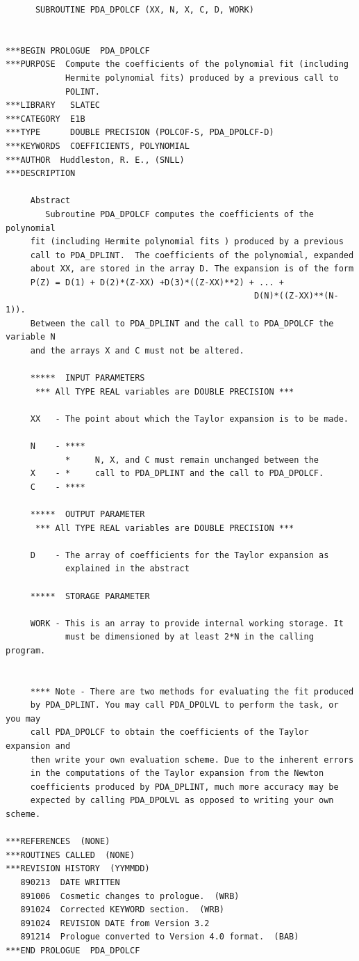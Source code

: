 \documentclass[11pt,twoside]{article}
\begin{document}
\begin{verbatim}
      SUBROUTINE PDA_DPOLCF (XX, N, X, C, D, WORK)


***BEGIN PROLOGUE  PDA_DPOLCF
***PURPOSE  Compute the coefficients of the polynomial fit (including
            Hermite polynomial fits) produced by a previous call to
            POLINT.
***LIBRARY   SLATEC
***CATEGORY  E1B
***TYPE      DOUBLE PRECISION (POLCOF-S, PDA_DPOLCF-D)
***KEYWORDS  COEFFICIENTS, POLYNOMIAL
***AUTHOR  Huddleston, R. E., (SNLL)
***DESCRIPTION

     Abstract
        Subroutine PDA_DPOLCF computes the coefficients of the polynomial
     fit (including Hermite polynomial fits ) produced by a previous
     call to PDA_DPLINT.  The coefficients of the polynomial, expanded
     about XX, are stored in the array D. The expansion is of the form
     P(Z) = D(1) + D(2)*(Z-XX) +D(3)*((Z-XX)**2) + ... +
                                                  D(N)*((Z-XX)**(N-1)).
     Between the call to PDA_DPLINT and the call to PDA_DPOLCF the variable N
     and the arrays X and C must not be altered.

     *****  INPUT PARAMETERS
      *** All TYPE REAL variables are DOUBLE PRECISION ***

     XX   - The point about which the Taylor expansion is to be made.

     N    - ****
            *     N, X, and C must remain unchanged between the
     X    - *     call to PDA_DPLINT and the call to PDA_DPOLCF.
     C    - ****

     *****  OUTPUT PARAMETER
      *** All TYPE REAL variables are DOUBLE PRECISION ***

     D    - The array of coefficients for the Taylor expansion as
            explained in the abstract

     *****  STORAGE PARAMETER

     WORK - This is an array to provide internal working storage. It
            must be dimensioned by at least 2*N in the calling program.


     **** Note - There are two methods for evaluating the fit produced
     by PDA_DPLINT. You may call PDA_DPOLVL to perform the task, or you may
     call PDA_DPOLCF to obtain the coefficients of the Taylor expansion and
     then write your own evaluation scheme. Due to the inherent errors
     in the computations of the Taylor expansion from the Newton
     coefficients produced by PDA_DPLINT, much more accuracy may be
     expected by calling PDA_DPOLVL as opposed to writing your own scheme.

***REFERENCES  (NONE)
***ROUTINES CALLED  (NONE)
***REVISION HISTORY  (YYMMDD)
   890213  DATE WRITTEN
   891006  Cosmetic changes to prologue.  (WRB)
   891024  Corrected KEYWORD section.  (WRB)
   891024  REVISION DATE from Version 3.2
   891214  Prologue converted to Version 4.0 format.  (BAB)
***END PROLOGUE  PDA_DPOLCF
\end{verbatim}
\end{document}
